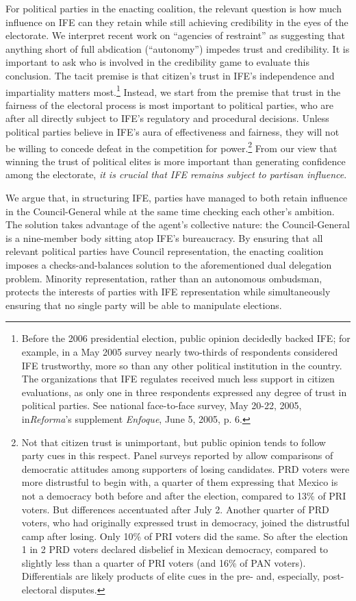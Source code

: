\documentclass[12 pt, letter]{article}
\begin{document}
For political parties in the enacting coalition, the relevant question is how much influence on IFE can they retain while still achieving credibility in the eyes of the electorate.  We interpret recent work on ``agencies of restraint'' \citep{Schedler1999, Eisenstadt2004} as suggesting that anything short of full abdication (``autonomy'') impedes trust and credibility.  It is important to ask who is involved in the credibility game to evaluate this conclusion.  The tacit premise is that citizen's trust in IFE's independence and impartiality matters most.\footnote{Before the 2006 presidential election, public opinion decidedly backed IFE; for example, in a May 2005 survey nearly two-thirds of respondents considered IFE trustworthy, more so than any other political institution in the country.  The organizations that IFE regulates received much less support in citizen evaluations, as only one in three respondents expressed any degree of trust in political parties.  See national face-to-face survey, May 20-22, 2005, in\emph{Reforma}'s supplement \emph{Enfoque}, June 5, 2005, p. 6.}  Instead, we start from the premise that trust in the fairness of the electoral process is most important to political parties, who are after all directly subject to IFE's regulatory and procedural decisions.  Unless political parties believe in IFE's aura of effectiveness and fairness, they will not be willing to concede defeat in the competition for power.\footnote{Not that citizen trust is unimportant, but public opinion tends to follow party cues in this respect.  Panel surveys reported by \citet{Estrada2007} allow comparisons of democratic attitudes among supporters of losing candidates. PRD voters were more distrustful to begin with, a quarter of them expressing that Mexico is not a democracy both before and after the election, compared to 13\% of PRI voters. But differences accentuated after July 2.  Another quarter of PRD voters, who had originally expressed trust in democracy, joined the distrustful camp after losing.  Only 10\% of PRI voters did the same. So after the election 1 in 2 PRD voters declared disbelief in Mexican democracy, compared to slightly less than a quarter of PRI voters (and 16\% of PAN voters). Differentials are likely products of elite cues in the pre- and, especially, post-electoral disputes.} From our view that winning the trust of political elites is more important than generating confidence among the electorate, \emph{it is crucial that IFE remains subject to partisan influence}.

We argue that, in structuring IFE, parties have managed to both retain influence in the Council-General while at the same time checking each other's ambition.  The solution takes advantage of the agent's collective nature: the Council-General is a nine-member body sitting atop IFE's bureaucracy.  By ensuring that all relevant political parties have Council representation, the enacting coalition imposes a checks-and-balances solution to the aforementioned dual delegation problem. Minority representation, rather than an autonomous ombudsman, protects the interests of parties with IFE representation while simultaneously ensuring that no single party will be able to manipulate elections.
\end{document}
